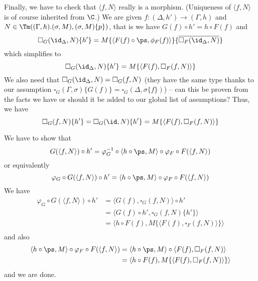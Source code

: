 \documentclass{article}
\newcommand{\isoFL}{\ensuremath{\phi_{F}}} %
\begin{document}
Finally, we have to check that $\langle f, N \rangle$ really is a
morphism. (Uniqueness of $\langle f, N\rangle$ is of course inherited
from $\C$.)  We are given $f : (\Delta, h') \to (\Gamma, h)$ and $N
\in \Tm((\Gamma, h).(\sigma, M), (\sigma, M)\{p\})$, that is we have
$G(f) \circ h' = h \circ F(f)$ and
\[
\square_G(\id_{\Delta}, N)\{h'\} = M\{\langle F(f) \circ \ps, \isoFL(f)\rangle\}\{\overline{\square_F(\id_{\Delta}, N)}\}
\]
which simplifies to
\[
\square_G(\id_{\Delta}, N)\{h'\} = M\{\langle F(f), \square_F(f, N)\rangle\}
\]
We also need that $\square_G(\id_{\Delta}, N) = \square_G(f, N)$ (they
have the same type thanks to our assumption $\square_G(\Gamma,
\sigma)\{G(f)\} = \square_G(\Delta, \sigma\{f\})$) -- can this be
proven from the facts we have or should it be added to our global list
of assumptions? Thus, we have
\[
\square_G(f, N)\{h'\} = \square_G(\id, N)\{h'\} = M\{\langle F(f), \square_F(f, N)\rangle\}
\]

We have to show that
\[
G(\langle f, N\rangle) \circ h' = \varphi_G^{-1} \circ \langle h \circ \ps, M\rangle \circ \varphi_F \circ F(\langle f, N\rangle)
\]
or equivalently
\[
\varphi_G \circ G(\langle f, N\rangle) \circ h' = \langle h \circ \ps, M\rangle \circ \varphi_F \circ F(\langle f, N\rangle)
\]
We have
\begin{align*}
  \varphi_G \circ G(\langle f, N\rangle) \circ h'
 &= \langle G(f), \square_G(f, N)\rangle \circ h' \\
 &= \langle G(f) \circ h', \square_G(f, N)\{h'\}\rangle \\
 &= \langle h \circ F(f), M\{\langle F(f), \square_F(f, N)\rangle\}\rangle \\
\end{align*}
and also
\begin{align*}
  \langle h \circ \ps, M\rangle \circ \varphi_F \circ F(\langle f, N\rangle)
 &= \langle h \circ \ps, M\rangle \circ \langle F(f), \square_F(f, N)\rangle \\
 &= \langle h \circ F(f), M\{\langle F(f), \square_F(f, N)\rangle\}\rangle \\
\end{align*}
and we are done.



\end{document}
